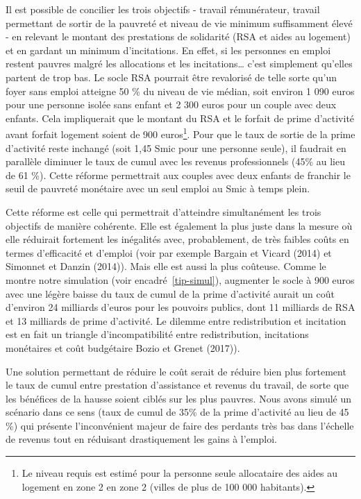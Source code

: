 \documentclass[
  french,
]{article}
\begin{document}
Il est possible de concilier les trois objectifs - travail rémunérateur,
travail permettant de sortir de la pauvreté et niveau de vie minimum
suffisamment élevé - en relevant le montant des prestations de
solidarité (RSA et aides au logement) et en gardant un minimum
d'incitations. En effet, si les personnes en emploi restent pauvres
malgré les allocations et les incitations\ldots{} c'est simplement
qu'elles partent de trop bas. Le socle RSA pourrait être revalorisé de
telle sorte qu'un foyer sans emploi atteigne 50 \% du niveau de vie
médian, soit environ 1 090 euros pour une personne isolée sans enfant et
2 300 euros pour un couple avec deux enfants. Cela impliquerait que le
montant du RSA et le forfait de prime d'activité avant forfait logement
soient de 900 euros\footnote{Le niveau requis est estimé pour la
  personne seule allocataire des aides au logement en zone 2 en zone 2
  (villes de plus de 100 000 habitants).}. Pour que le taux de sortie de
la prime d'activité reste inchangé (soit 1,45 Smic pour une personne
seule), il faudrait en parallèle diminuer le taux de cumul avec les
revenus professionnels (45\% au lieu de 61 \%). Cette réforme
permettrait aux couples avec deux enfants de franchir le seuil de
pauvreté monétaire avec un seul emploi au Smic à temps plein.

Cette réforme est celle qui permettrait d'atteindre simultanément les
trois objectifs de manière cohérente. Elle est également la plus juste
dans la mesure où elle réduirait fortement les inégalités avec,
probablement, de très faibles coûts en termes d'efficacité et d'emploi
(voir par exemple Bargain et Vicard (2014) et Simonnet et Danzin
(2014)). Mais elle est aussi la plus coûteuse. Comme le montre notre
simulation (voir encadré~\ref{tip-simul}), augmenter le socle à 900
euros avec une légère baisse du taux de cumul de la prime d'activité
aurait un coût d'environ 24 milliards d'euros pour les pouvoirs publics,
dont 11 milliards de RSA et 13 milliards de prime d'activité. Le dilemme
entre redistribution et incitation est en fait un triangle
d'incompatibilité entre redistribution, incitations monétaires et coût
budgétaire Bozio et Grenet (2017)).

Une solution permettant de réduire le coût serait de réduire bien plus
fortement le taux de cumul entre prestation d'assistance et revenus du
travail, de sorte que les bénéfices de la hausse soient ciblés sur les
plus pauvres. Nous avons simulé un scénario dans ce sens (taux de cumul
de 35\% de la prime d'activité au lieu de 45 \%) qui présente
l'inconvénient majeur de faire des perdants très bas dans l'échelle de
revenus tout en réduisant drastiquement les gains à l'emploi.
\end{document}
